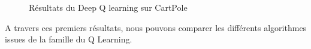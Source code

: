 \begin{figure}[ht!]
\begin{minipage}{.5\linewidth}
\centering
{}
\end{minipage}%
\begin{minipage}{.5\linewidth}
\centering
{}
\end{minipage}\par\medskip
\caption{Résultats du Deep Q learning sur CartPole}
\end{figure}

A travers ces premiers résultats, nous pouvons comparer les différents algorithmes issues de la famille du Q Learning.

